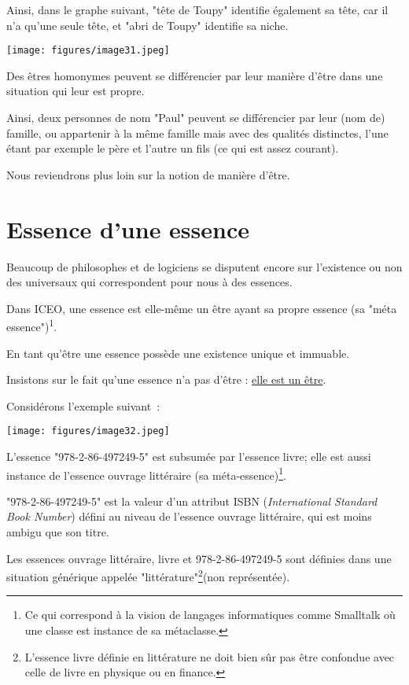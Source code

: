 \documentclass[a4paper, 12pt, openright, french]{book}
\begin{document}
Ainsi, dans le graphe suivant, "tête de Toupy" identifie également sa
tête, car il n'a qu'une seule tête, et
"abri de Toupy" identifie sa niche.

\texttt{[image: figures/image31.jpeg]}

Des êtres homonymes peuvent se différencier par leur manière
d'être dans une situation qui leur est propre.

Ainsi, deux personnes de nom "Paul" peuvent se différencier par leur
(nom de) famille, ou appartenir à la même famille mais avec des qualités
distinctes, l'une étant par exemple le père et
l'autre un fils (ce qui est assez courant).

Nous reviendrons plus loin sur la notion de manière
d'être.


\newpage
\section{Essence d'une essence}

Beaucoup de philosophes et de logiciens se disputent encore sur
l'existence ou non des universaux qui correspondent pour
nous à des essences.

Dans ICEO, une essence est elle-même un être ayant sa propre essence (sa
"méta essence")\textsuperscript{1}.

En tant qu'être une essence possède une existence unique
et immuable.

Insistons sur le fait qu'une essence n'a
pas d'être : \uline{elle est un être}.

Considérons l'exemple suivant~:

\texttt{[image: figures/image32.jpeg]}

L'essence "978-2-86-497249-5" est subsumée par
l'essence livre; elle est aussi instance de
l'essence ouvrage littéraire (sa méta-essence)\footnote{Ce qui correspond à la vision de langages
	informatiques comme Smalltalk où une classe est instance de sa
	métaclasse.}.

"978-2-86-497249-5" est la valeur d'un attribut ISBN
(\emph{International Standard Book Number}) défini au niveau de
l'essence ouvrage littéraire, qui est moins ambigu que
son titre.

Les essences ouvrage littéraire, livre et 978-2-86-497249-5 sont
définies dans une situation générique appelée
"littérature"\footnote{ L'essence livre définie en
	littérature ne doit bien sûr pas être confondue avec celle de livre en
	physique ou en finance.}(non représentée).
\end{document}
